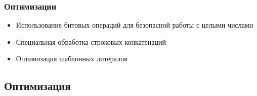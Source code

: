\subsubsection*{Оптимизации}
\begin{itemize}[label={--}]
    \item Использование битовых операций для безопасной работы с целыми числами
    \item Специальная обработка строковых конкатенаций
    \item Оптимизация шаблонных литералов
\end{itemize}

\subsection{Оптимизация}
\newpage